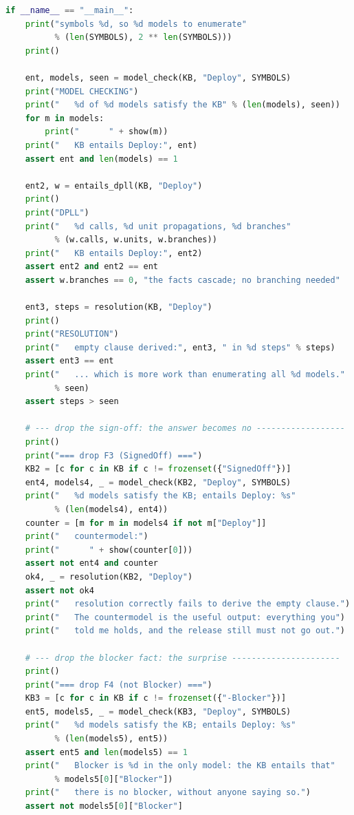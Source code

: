 \begin{lab}
\begin{lstlisting}[language=Python]
if __name__ == "__main__":
    print("symbols %d, so %d models to enumerate"
          % (len(SYMBOLS), 2 ** len(SYMBOLS)))
    print()

    ent, models, seen = model_check(KB, "Deploy", SYMBOLS)
    print("MODEL CHECKING")
    print("   %d of %d models satisfy the KB" % (len(models), seen))
    for m in models:
        print("      " + show(m))
    print("   KB entails Deploy:", ent)
    assert ent and len(models) == 1

    ent2, w = entails_dpll(KB, "Deploy")
    print()
    print("DPLL")
    print("   %d calls, %d unit propagations, %d branches"
          % (w.calls, w.units, w.branches))
    print("   KB entails Deploy:", ent2)
    assert ent2 and ent2 == ent
    assert w.branches == 0, "the facts cascade; no branching needed"

    ent3, steps = resolution(KB, "Deploy")
    print()
    print("RESOLUTION")
    print("   empty clause derived:", ent3, " in %d steps" % steps)
    assert ent3 == ent
    print("   ... which is more work than enumerating all %d models."
          % seen)
    assert steps > seen

    # --- drop the sign-off: the answer becomes no ------------------
    print()
    print("=== drop F3 (SignedOff) ===")
    KB2 = [c for c in KB if c != frozenset({"SignedOff"})]
    ent4, models4, _ = model_check(KB2, "Deploy", SYMBOLS)
    print("   %d models satisfy the KB; entails Deploy: %s"
          % (len(models4), ent4))
    counter = [m for m in models4 if not m["Deploy"]]
    print("   countermodel:")
    print("      " + show(counter[0]))
    assert not ent4 and counter
    ok4, _ = resolution(KB2, "Deploy")
    assert not ok4
    print("   resolution correctly fails to derive the empty clause.")
    print("   The countermodel is the useful output: everything you")
    print("   told me holds, and the release still must not go out.")

    # --- drop the blocker fact: the surprise ----------------------
    print()
    print("=== drop F4 (not Blocker) ===")
    KB3 = [c for c in KB if c != frozenset({"-Blocker"})]
    ent5, models5, _ = model_check(KB3, "Deploy", SYMBOLS)
    print("   %d models satisfy the KB; entails Deploy: %s"
          % (len(models5), ent5))
    assert ent5 and len(models5) == 1
    print("   Blocker is %d in the only model: the KB entails that"
          % models5[0]["Blocker"])
    print("   there is no blocker, without anyone saying so.")
    assert not models5[0]["Blocker"]


\end{lstlisting}
\end{lab}
